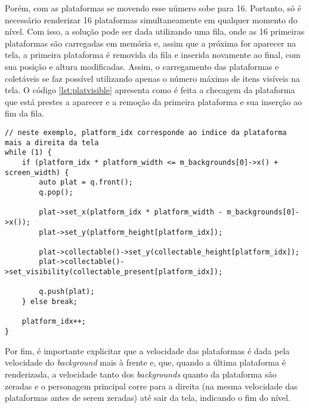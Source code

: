 Porém, com as plataformas se movendo esse número sobe para 16. Portanto, só é necessário renderizar 16 plataformas simultaneamente em qualquer momento do nível. Com isso, a solução pode ser dada utilizando uma fila, onde as 16 primeiras plataformas são carregadas em memória e, assim que a próxima for aparecer na tela, a primeira plataforma é removida da fila e inserida novamente ao final, com sua posição e altura modificadas. Assim, o carregamento das plataformas e coletáveis se faz possível utilizando apenas o número máximo de itens visíveis na tela. O código \ref{lst:platvisible} apresenta como é feita a checagem da plataforma que está prestes a aparecer e a remoção da primeira plataforma e sua inserção ao fim da fila.

\begin{lstlisting}[caption={Implementação da checagem da plataforma prestes a aparecer},label={lst:platvisible}]
// neste exemplo, platform_idx corresponde ao indice da plataforma mais a direita da tela
while (1) {
    if (platform_idx * platform_width <= m_backgrounds[0]->x() + screen_width) {
        auto plat = q.front();
        q.pop();

        plat->set_x(platform_idx * platform_width - m_backgrounds[0]->x());
        plat->set_y(platform_height[platform_idx]);

        plat->collectable()->set_y(collectable_height[platform_idx]);
        plat->collectable()->set_visibility(collectable_present[platform_idx]);

        q.push(plat);
    } else break;

    platform_idx++;
}
\end{lstlisting}

Por fim, é importante explicitar que a velocidade das plataformas é dada pela velocidade do \textit{background} mais à frente e, que, quando a última plataforma é renderizada, a velocidade tanto dos \textit{backgrounds} quanto da plataforma são zeradas e o personagem principal corre para a direita (na mesma velocidade das plataformas antes de serem zeradas) até sair da tela, indicando o fim do nível.